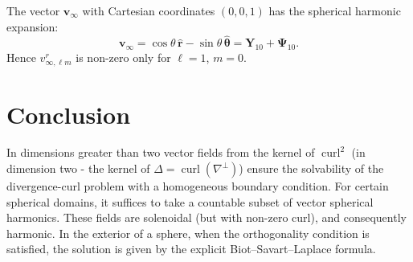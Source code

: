 \documentclass[a4paper]{article}
\newcommand{\curl}{\operatorname{curl}}
\newcommand{\bv}{\mathbf{v}}
\begin{document}
The vector $\bv_{\infty}$ with Cartesian coordinates $(0,0,1)$ has the spherical harmonic expansion:
$$
\bv_{\infty}=\cos \theta \,{\hat {\mathbf {r} }}-\sin \theta \,{\hat {\mathbf {\theta } }}=\mathbf {Y} _{10}+\mathbf{\Psi }_{10}.
$$
Hence $v_{\infty, \ell m}^{r}$ is non-zero only for $\ell=1$, $m=0$.





\section {Conclusion}
In dimensions greater than two vector fields from the kernel of $\curl^2$ (in dimension two - the kernel of $\Delta = \curl(\nabla^\perp)$) ensure the solvability of the divergence-curl problem with a homogeneous boundary condition. For certain spherical domains, it suffices to take a countable subset of vector spherical harmonics. These fields are solenoidal (but with non-zero curl), and consequently harmonic. In the exterior of a sphere, when the orthogonality condition is satisfied, the solution is given by the explicit Biot--Savart--Laplace formula.
\end{document}
